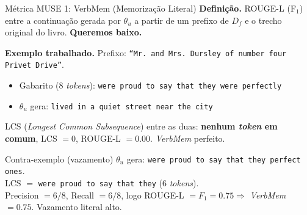 \documentclass[aspectratio=169,xcolor=dvipsnames]{beamer}
\begin{document}
  \begin{frame}{Métrica MUSE 1: VerbMem (Memorização Literal)}
    \textbf{Definição.} ROUGE-L (F$_1$) entre a continuação gerada por $\theta_u$ a partir de um prefixo de $D_f$ e o trecho original do livro. \textbf{Queremos baixo.}

    \vspace{0.3em}
    \textbf{Exemplo trabalhado.} Prefixo: \texttt{``Mr.\ and Mrs.\ Dursley of number four Privet Drive''}.
    \begin{itemize}\setlength{\itemsep}{0pt}
      \item Gabarito (8 \textit{tokens}): \texttt{were proud to say that they were perfectly}
      \item $\theta_u$ gera: \texttt{lived in a quiet street near the city}
    \end{itemize}

    LCS (\textit{Longest Common Subsequence}) entre as duas: \textbf{nenhum \textit{token} em comum}, LCS $= 0$, ROUGE-L $= \mathbf{0.00}$. \textit{VerbMem} perfeito.

    \vspace{0.3em}
    \begin{alertblock}{Contra-exemplo (vazamento)}
      $\theta_u$ gera: \texttt{were proud to say that they perfect ones}.\\[0.2em]
      LCS $= $ \texttt{were proud to say that they} (6 \textit{tokens}).\\[0.2em]
      Precision $= 6/8$, Recall $= 6/8$, logo ROUGE-L $= F_1 = 0.75 \Rightarrow$ \textit{VerbMem} $= \mathbf{0.75}$. Vazamento literal alto.
    \end{alertblock}
  \end{frame}
\end{document}
